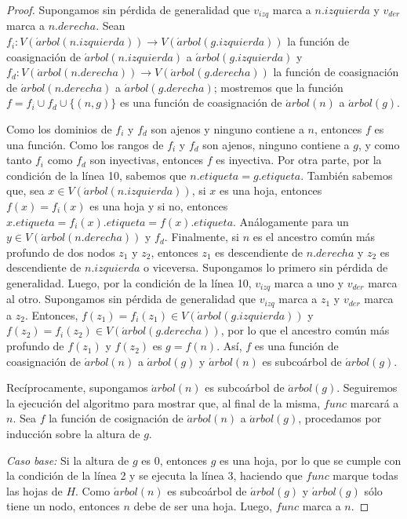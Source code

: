 \begin{proof}
    Supongamos sin pérdida de generalidad que $v_{izq}$ marca a
    $n.izquierda$ y $v_{der}$ marca a $n.derecha$. Sean $f_i \colon
    V(\acute{a}rbol(n.izquierda)) \rightarrow V(\acute{a}rbol(g.izquierda))$
    la función de coasignación de $\acute{a}rbol(n.izquierda)$ a
    $\acute{a}rbol(g.izquierda)$ y $f_d \colon V(\acute{a}rbol(n.derecha))
    \rightarrow V(\acute{a}rbol(g.derecha))$ la función de coasignación de
    $\acute{a}rbol(n.derecha)$ a $\acute{a}rbol(g.derecha)$; mostremos que la
    función $f = f_i \cup f_d \cup \{(n,g)\}$ es una función de coasignación
    de $\acute{a}rbol(n)$ a $\acute{a}rbol(g)$.

    Como los dominios de $f_i$ y $f_d$ son ajenos y ninguno contiene a $n$,
    entonces $f$ es una función. Como los rangos de $f_i$ y $f_d$ son ajenos,
    ninguno contiene a $g$, y como tanto $f_i$ como $f_d$ son inyectivas,
    entonces $f$ es inyectiva. Por otra parte, por la condición de la línea
    10, sabemos que $n.etiqueta = g.etiqueta$. También sabemos que, sea $x
    \in V(\acute{a}rbol (n.izquierda))$, si $x$ es una hoja, entonces $f(x) =
    f_i(x)$ es una hoja y si no, entonces $x.etiqueta = f_i(x).etiqueta =
    f(x).etiqueta$. Análogamente para un $y \in V(\acute{a}rbol(n.derecha))$ y
    $f_d$. Finalmente, si $n$ es el ancestro común más profundo de dos nodos
    $z_1$ y $z_2$, entonces $z_1$ es descendiente de $n.derecha$ y $z_2$ es
    descendiente de $n.izquierda$ o viceversa. Supongamos lo primero sin
    pérdida de generalidad. Luego, por la condición de la línea 10, $v_{izq}$
    marca a uno y $v_{der}$ marca al otro. Supongamos sin pérdida de
    generalidad que $v_{izq}$ marca a $z_1$ y $v_{der}$ marca a $z_2$.
    Entonces, $f(z_1) = f_i(z_1) \in V(\acute{a}rbol(g.izquierda))$ y $f(z_2)
    = f_i(z_2) \in V(\acute{a}rbol(g.derecha))$, por lo que el ancestro común
    más profundo de $f(z_1)$ y $f(z_2)$ es $g = f(n)$. Así, $f$ es una
    función de coasignación de $\acute{a}rbol(n)$ a $\acute{a}rbol(g)$ y
    $\acute{a}rbol(n)$ es subcoárbol de $\acute{a}rbol(g)$.

    Rec\'iprocamente, supongamos $\acute{a}rbol(n)$ es subcoárbol de
    $\acute{a}rbol(g)$. Seguiremos la ejecución del algoritmo para mostrar
    que, al final de la misma, $func$ marcará a $n$. Sea $f$ la función de
    cosignación de $\acute{a}rbol(n)$ a $\acute{a}rbol(g)$, procedamos por
    inducción sobre la altura de $g$.

    \emph{Caso base:} Si la altura de $g$ es 0, entonces $g$ es una hoja,
    por lo que se cumple con la condición de la línea 2 y se ejecuta la
    línea 3, haciendo que $func$ marque todas las hojas de $H$. Como
    $\acute{a}rbol(n)$ es subcoárbol de $\acute{a}rbol(g)$ y
    $\acute{a}rbol(g)$ sólo tiene un nodo, entonces $n$ debe de ser una
    hoja. Luego, $func$ marca a $n$.


\end{proof}
